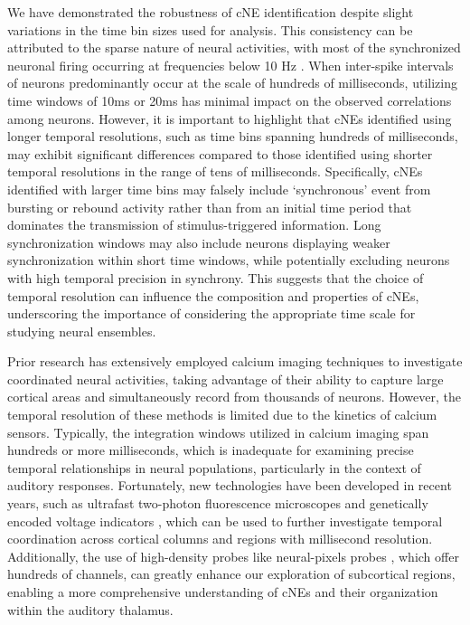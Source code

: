 \documentclass[11pt]{article}
\begin{document}
We have demonstrated the robustness of cNE identification despite slight variations in the time bin sizes used for analysis. This consistency can be attributed to the sparse nature of neural activities, with most of the synchronized neuronal firing occurring at frequencies below 10 Hz \citep{o2010neural}. When inter-spike intervals of neurons predominantly occur at the scale of hundreds of milliseconds, utilizing time windows of 10ms or 20ms has minimal impact on the observed correlations among neurons. However, it is important to highlight that cNEs identified using longer temporal resolutions, such as time bins spanning hundreds of milliseconds, may exhibit significant differences compared to those identified using shorter temporal resolutions in the range of tens of milliseconds. Specifically, cNEs identified with larger time bins may falsely include ‘synchronous’ event from bursting or rebound activity rather than from an initial time period that dominates the transmission of stimulus-triggered information. Long synchronization windows may also include neurons displaying weaker synchronization within short time windows, while potentially excluding neurons with high temporal precision in synchrony. This suggests that the choice of temporal resolution can influence the composition and properties of cNEs, underscoring the importance of considering the appropriate time scale for studying neural ensembles.

Prior research has extensively employed calcium imaging techniques to investigate coordinated neural activities, taking advantage of their ability to capture large cortical areas and simultaneously record from thousands of neurons. However, the temporal resolution of these methods is limited due to the kinetics of calcium sensors. Typically, the integration windows utilized in calcium imaging span hundreds or more milliseconds, which is inadequate for examining precise temporal relationships in neural populations, particularly in the context of auditory responses. Fortunately, new technologies have been developed in recent years, such as ultrafast two-photon fluorescence microscopes \citep{kazemipour2019kilohertz, wu2017ultrafast} and genetically encoded voltage indicators \citep{chamberland2017fast, villette2019ultrafast}, which can be used to further investigate temporal coordination across cortical columns and regions with millisecond resolution. Additionally, the use of high-density probes like neural-pixels probes \citep{jun2017fully}, which offer hundreds of channels, can greatly enhance our exploration of subcortical regions, enabling a more comprehensive understanding of cNEs and their organization within the auditory thalamus.
\end{document}
